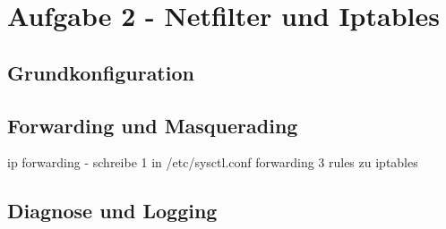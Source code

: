 \chapter{Aufgabe 2 - Netfilter und Iptables}
\section{Grundkonfiguration}

\section{Forwarding und Masquerading}
ip  forwarding - schreibe 1 in /etc/sysctl.conf forwarding
3 rules zu iptables

\section{Diagnose und Logging}

